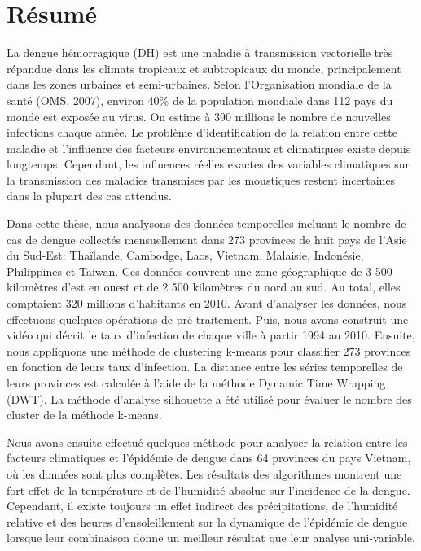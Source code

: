     
\chapter*{Résumé}

La dengue hémorragique (DH) est une maladie à transmission vectorielle très répandue dans les climats tropicaux et subtropicaux du monde, principalement dans les zones urbaines et semi-urbaines. Selon l'Organisation mondiale de la santé (OMS, 2007), environ 40\% de la population mondiale dans 112 pays du monde est exposée au virus. On estime à 390 millions le nombre de nouvelles infections chaque année. Le problème d’identification de la relation entre cette maladie et l’influence des facteurs environnementaux et climatiques existe depuis longtemps. Cependant, les influences réelles exactes des variables climatiques sur la transmission des maladies transmises par les moustiques restent incertaines dans la plupart des cas attendus.

Dans cette thèse, nous analysons des données temporelles incluant le nombre de cas de dengue collectés mensuellement dans 273 provinces de huit pays de l’Asie du Sud-Est: Thaïlande, Cambodge, Laos, Vietnam, Malaisie, Indonésie, Philippines et Taiwan. Ces données couvrent une zone géographique de 3 500 kilomètres d'est en ouest et de 2 500 kilomètres du nord au sud. Au total, elles comptaient 320 millions d'habitants en 2010. Avant d'analyser les données, nous effectuons quelques opérations de pré-traitement. Puis, nous avons construit une vidéo qui décrit le taux d’infection de chaque ville à partir 1994 au 2010. Ensuite, nous appliquons une méthode de clustering k-means pour classifier 273 provinces en fonction de leurs taux d’infection. La distance entre les séries temporelles de leurs provinces est calculée à l'aide de la méthode Dynamic Time Wrapping (DWT). La méthode d'analyse silhouette a été utilisé pour évaluer le nombre des cluster de la méthode k-means.

Nous avons ensuite effectué quelques méthode pour analyser la relation entre les facteurs climatiques et l’épidémie de dengue dans 64 provinces du pays Vietnam, où les données sont plus complètes. Les résultats des algorithmes montrent une fort effet de la température et de l'humidité absolue sur l'incidence de la dengue. Cependant, il existe toujours un effet indirect des précipitations, de l'humidité relative et des heures d'ensoleillement sur la dynamique de l'épidémie de dengue lorsque leur combinaison donne un meilleur résultat que leur analyse uni-variable.
 
